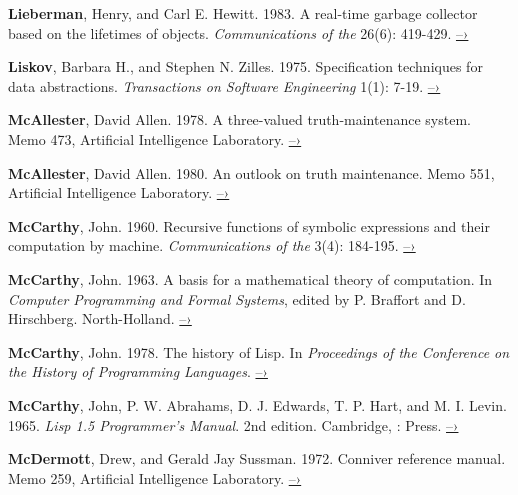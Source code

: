 { \label{Lieberman and Hewitt 1983}
\textbf{Lieberman}, Henry, and Carl E. Hewitt. 1983. A real-time
garbage collector based
on the lifetimes of objects. \textit{Communications of the }
26(6): 419-429.
\href{http://dspace.mit.edu/handle/1721.1/6335}{–›}

 \label{Liskov and Zilles (1975)}
\textbf{Liskov}, Barbara H., and Stephen N. Zilles.  1975.
Specification techniques for
data abstractions.  \textit{ Transactions on Software
Engineering}
1(1): 7-19.
\href{http://csg.csail.mit.edu/CSGArchives/memos/Memo-117.pdf}{–›}

 \label{McAllester (1978; 1980)}
\textbf{McAllester}, David Allen.  1978.  A three-valued
truth-maintenance system.  Memo
473,  Artificial Intelligence Laboratory.
\href{http://dspace.mit.edu/handle/1721.1/6296}{–›}

\textbf{McAllester}, David Allen.  1980.  An outlook on truth
maintenance.  Memo 551,
 Artificial Intelligence Laboratory.
\href{http://dspace.mit.edu/handle/1721.1/6327}{–›}

 \label{McCarthy 1960}
\textbf{McCarthy}, John.  1960.  Recursive functions of symbolic
expressions and their
computation by machine.  \textit{Communications of the }
3(4): 184-195.
\href{http://www-formal.stanford.edu/jmc/recursive.pdf}{–›}

 \label{McCarthy 1963}
\textbf{McCarthy}, John.  1963.  A basis for a mathematical theory
of computation.  In
\textit{Computer Programming and Formal Systems}, edited by P. Braffort and
D. Hirschberg.  North-Holland.
\href{http://www-formal.stanford.edu/jmc/basis.html}{–›}

 \label{McCarthy 1978}
\textbf{McCarthy}, John.  1978.  The history of Lisp.  In
\textit{Proceedings of the
    Conference on the History of Programming
Languages}.
\href{http://www-formal.stanford.edu/jmc/history/lisp/lisp.html}{–›}

 \label{McCarthy et al. 1965}
\textbf{McCarthy}, John, P. W. Abrahams, D. J. Edwards, T. P. Hart,
and M. I.  Levin.
1965.  \textit{Lisp 1.5 Programmer's Manual}.  2nd edition.
Cambridge, :
 Press.
\href{http://www.softwarepreservation.org/projects/LISP/book/LISP\%201.5\%20Programmers\%20Manual.pdf/view}{–›}

 \label{McDermott and Sussman (1972)}
\textbf{McDermott}, Drew, and Gerald Jay Sussman.  1972. Conniver
reference manual.
Memo 259,  Artificial Intelligence Laboratory.
\href{http://dspace.mit.edu/handle/1721.1/6203}{–›}

}
